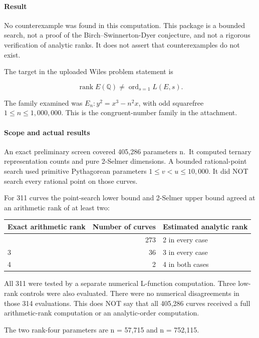 \documentclass[11pt]{article}
\begin{document}
\paragraph{Result}

No counterexample was found in this computation. This package is a bounded search, not a proof of the Birch--Swinnerton-Dyer conjecture, and not a rigorous verification of analytic ranks. It does not assert that counterexamples do not exist.

The target in the uploaded Wiles problem statement is

\[\operatorname{rank}E(\mathbb Q)\ne\operatorname{ord}_{s=1}L(E,s).\]

The family examined was \(E_n:y^2=x^3-n^2x\), with odd squarefree \(1\le n\le 1{,}000{,}000\). This is the congruent-number family in the attachment.

\paragraph{Scope and actual results}

An exact preliminary screen covered 405,286 parameters n.~It computed ternary representation counts and pure 2-Selmer dimensions. A bounded rational-point search used primitive Pythagorean parameters \(1\le v<u\le10{,}000\). It did NOT search every rational point on those curves.

For 311 curves the point-search lower bound and 2-Selmer upper bound agreed at an arithmetic rank of at least two:

\begingroup\small\setlength{\tabcolsep}{4pt}
\begin{longtable}[]{@{}lrl@{}}
\toprule\noalign{}
Exact arithmetic rank & Number of curves & Estimated analytic rank \\
\midrule\noalign{}
\endhead
\bottomrule\noalign{}
\endlastfoot
2 & 273 & 2 in every case \\
3 & 36 & 3 in every case \\
4 & 2 & 4 in both cases \\
\end{longtable}
\endgroup

All 311 were tested by a separate numerical L-function computation. Three low-rank controls were also evaluated. There were no numerical disagreements in those 314 evaluations. This does NOT say that all 405,286 curves received a full arithmetic-rank computation or an analytic-order computation.

The two rank-four parameters are n = 57,715 and n = 752,115.
\end{document}
